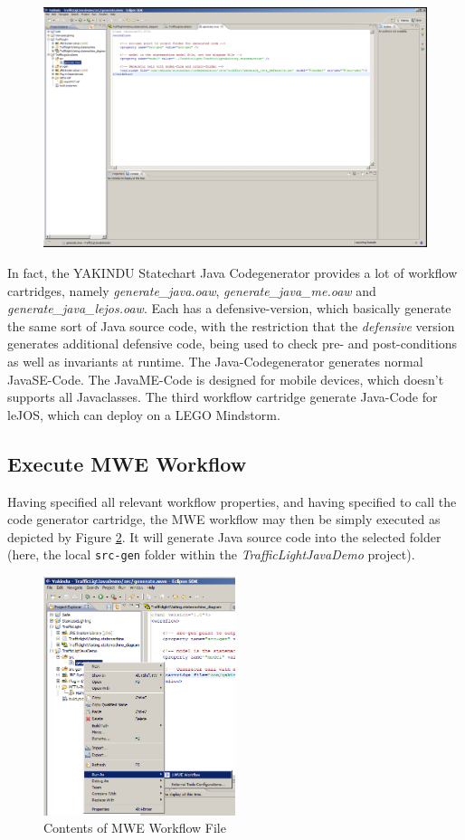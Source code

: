 \begin{figure}[h!]
\center
\includegraphics[width=\textwidth]{./Pictures/Screenshot13}
\caption{\label{fig:screenshot13}}
\end{figure}

In fact, the YAKINDU Statechart Java Codegenerator provides a lot of workflow
cartridges, namely \emph{generate\_java.oaw}, \emph{generate\_java\_me.oaw} and
\emph{generate\_java\_lejos.oaw}. Each has a defensive-version, which
basically generate the same sort of
Java source code, with the restriction that the \emph{defensive} version
generates additional defensive code, being used to check pre- and
post-conditions as well as invariants at runtime.
The Java-Codegenerator generates normal JavaSE-Code. The JavaME-Code is designed
for mobile devices, which doesn't supports all Javaclasses.
The third workflow cartridge generate Java-Code for leJOS, which can deploy on a
LEGO Mindstorm.

\clearpage
\subsection{Execute MWE Workflow}
Having specified all relevant workflow properties, and having specified to
call the code generator cartridge, the MWE workflow may then be simply
executed as depicted by Figure \ref{fig:screenshot14}. It will generate Java
source code into the selected folder (here, the local \texttt{src-gen} folder
within the \emph{TrafficLightJavaDemo} project).

\begin{figure}[h!]
\center
\includegraphics[width=0.5\textwidth]{./Pictures/Screenshot14}
\caption{\label{fig:screenshot14} Contents of MWE Workflow File}
\end{figure}

\clearpage